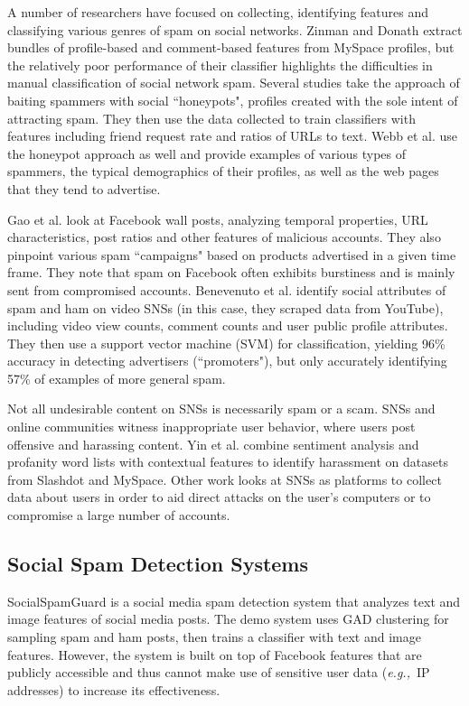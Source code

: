 \documentclass[preprint]{acm_proc_article-sp}
\newcommand{\eg}{{\em e.g.,}~}
\begin{document}
A number of researchers have focused on collecting, identifying features 
and classifying various genres of spam on social networks. Zinman and 
Donath \cite{zinman} extract bundles of profile-based and comment-based 
features from MySpace profiles, but the relatively poor performance of their classifier highlights 
the difficulties in manual classification of social network spam. Several 
studies \cite{stringhini, lee} take the approach of baiting spammers with social ``honeypots", profiles 
created with the sole intent of attracting spam. They 
then use the data collected to train classifiers with features including 
friend request rate and ratios of URLs to text. Webb et al. \cite{webb} use 
the honeypot approach as well and provide examples of various types of spammers, 
the typical demographics of their profiles, as well as the web pages that they tend to advertise. 

Gao et al. \cite{gao} look at Facebook wall posts, analyzing temporal properties, 
URL characteristics, post ratios and other features of malicious accounts. They 
also pinpoint various spam ``campaigns" based on products advertised in a given 
time frame. They note that spam on Facebook often exhibits burstiness and is mainly 
sent from compromised accounts. Benevenuto et al. \cite{benevenuto} identify 
social attributes of spam and ham on video SNSs (in this case, they scraped data from 
YouTube), including video view counts, comment counts and user public profile attributes. 
They then use a support vector machine (SVM) for classification, yielding 96\% accuracy in detecting 
advertisers (``promoters"), but only accurately identifying 57\% of examples of more general spam.

Not all undesirable content on SNSs is necessarily spam or a scam. SNSs and 
online communities witness inappropriate user behavior, where users post offensive 
and harassing content. Yin et al. \cite{yin} combine sentiment analysis and profanity 
word lists with contextual features to identify harassment on datasets from Slashdot 
and MySpace. Other work looks at SNSs as platforms to collect data about users in 
order to aid direct attacks on the user's computers or to compromise a large 
number of accounts. \cite{patsakis, huber}

\subsection{Social Spam Detection Systems}

SocialSpamGuard \cite{jin} is a social media spam detection system that analyzes 
text and image features of social media posts. The demo system uses GAD 
clustering \cite{jingad} for sampling spam and ham posts, then trains a 
classifier with text and image features. However, the system is built on top 
of Facebook features that are publicly accessible and thus cannot make use of 
sensitive user data (\eg IP addresses) to increase its effectiveness. 
\end{document}
